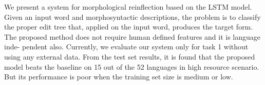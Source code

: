 We present a system for morphological reinflection based on the LSTM model. Given an input word and morphosyntactic descriptions, the problem is to classify the proper edit tree that, applied on the input word, produces the target form. The proposed method does not require human defined features and it is language inde- pendent also. Currently, we evaluate our system only for task 1 without using any external data. From the test set results, it is found that the proposed model beats the baseline on 15 out of the 52 languages in high resource scenario. But its performance is poor when the training set size is medium or low.
